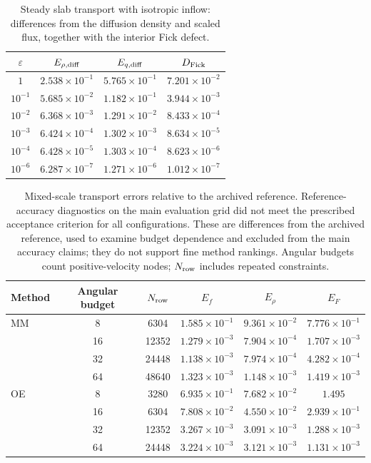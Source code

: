 \begin{table}[!htb]
\centering\small
\setlength{\tabcolsep}{7pt}
\caption{Steady slab transport with isotropic inflow: differences from the diffusion density and scaled flux, together with the interior Fick defect.}
\label{tab:slab-diffusion}
\begin{tabular}{cccc}
\toprule
$\varepsilon$ & $E_{\rho,\rm diff}$ & $E_{q,\rm diff}$ & $D_{\rm Fick}$\\
\midrule
$1$ & $2.538\times10^{-1}$ & $5.765\times10^{-1}$ & $7.201\times10^{-2}$\\
$10^{-1}$ & $5.685\times10^{-2}$ & $1.182\times10^{-1}$ & $3.944\times10^{-3}$\\
$10^{-2}$ & $6.368\times10^{-3}$ & $1.291\times10^{-2}$ & $8.433\times10^{-4}$\\
$10^{-3}$ & $6.424\times10^{-4}$ & $1.302\times10^{-3}$ & $8.634\times10^{-5}$\\
$10^{-4}$ & $6.428\times10^{-5}$ & $1.303\times10^{-4}$ & $8.623\times10^{-6}$\\
$10^{-6}$ & $6.287\times10^{-7}$ & $1.271\times10^{-6}$ & $1.012\times10^{-7}$\\
\bottomrule
\end{tabular}
\end{table}

\begin{table}[!htb]
\centering
\small
\setlength{\tabcolsep}{5pt}
\caption{Mixed-scale transport errors relative to the archived reference. Reference-accuracy diagnostics on the main evaluation grid did not meet the prescribed acceptance criterion for all configurations. These are differences from the archived reference, used to examine budget dependence and excluded from the main accuracy claims; they do not support fine method rankings.
Angular budgets count positive-velocity nodes; $N_{\rm row}$ includes repeated constraints.}
\label{tab:mixed-budget}
\begin{tabular}{lccccc}
\toprule
Method & Angular budget & $N_{\rm row}$ & $E_f$ & $E_\rho$ & $E_F$ \\
\midrule
MM & 8  & 6304  & $1.585\times10^{-1}$ & $9.361\times10^{-2}$ & $7.776\times10^{-1}$ \\
   & 16 & 12352 & $1.279\times10^{-3}$ & $7.904\times10^{-4}$ & $1.707\times10^{-3}$ \\
   & 32 & 24448 & $1.138\times10^{-3}$ & $7.974\times10^{-4}$ & $4.282\times10^{-4}$ \\
   & 64 & 48640 & $1.323\times10^{-3}$ & $1.148\times10^{-3}$ & $1.419\times10^{-3}$ \\
\addlinespace
OE & 8  & 3280  & $6.935\times10^{-1}$ & $7.682\times10^{-2}$ & $1.495$ \\
   & 16 & 6304  & $7.808\times10^{-2}$ & $4.550\times10^{-2}$ & $2.939\times10^{-1}$ \\
   & 32 & 12352 & $3.267\times10^{-3}$ & $3.091\times10^{-3}$ & $1.288\times10^{-3}$ \\
   & 64 & 24448 & $3.224\times10^{-3}$ & $3.121\times10^{-3}$ & $1.131\times10^{-3}$ \\
\bottomrule
\end{tabular}
\end{table}

